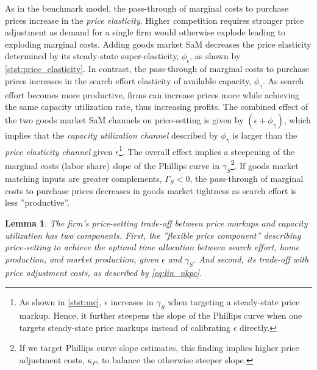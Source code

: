 \documentclass[12pt,3p,authoryear,review]{elsarticle}
\newtheorem{lemma}{Lemma}
\begin{document}
As in the benchmark model, the pass-through of marginal costs to purchase prices increase in the \emph{price elasticity}. Higher competition requires stronger price adjustment as demand for a single firm would otherwise explode leading to exploding marginal costs. Adding goods market SaM decreases the price elasticity determined by its steady-state super-elasticity, $\phi_\epsilon$, as shown by \eqref{stst:price_elasticity}. In contrast, the pass-through of marginal costs to purchase prices increases in the search effort elasticity of available capacity, $\phi_\gamma$. As search effort becomes more productive, firms can increase prices more while achieving the same capacity utilization rate, thus increasing profits. The combined effect of the two goods market SaM channels on price-setting is given by $(\epsilon+\phi_\gamma)$, which implies that the \emph{capacity utilization channel} described by $\phi_\gamma$ is larger than the \emph{price elasticity channel} given $\epsilon$\footnote{As shown in \eqref{stst:mc}, $\epsilon$ increases in $\gamma_S$ when targeting a steady-state price markup. Hence, it further steepens the slope of the Phillips curve when one targets steady-state price markups instead of calibrating $\epsilon$ directly.}. The overall effect implies a steepening of the marginal costs (labor share) slope of the Phillips curve in $\gamma_S$\footnote{If we target Phillips curve slope estimates, this finding implies higher price adjustment costs, $\kappa_P$, to balance the otherwise steeper slope.}. If goods market matching inputs are greater complements, $\Gamma_S < 0$, the pass-through of marginal costs to purchase prices decreases in goods market tightness as search effort is less ''productive''.%
\begin{lemma}\label{lem:nkpc}%
	The firm's price-setting trade-off between price markups and capacity utilization has two components. First, the ''flexible price component'' describing price-setting to achieve the optimal time allocation between search effort, home production, and market production, given $\epsilon$ and $\gamma_S$. And second, its trade-off with price adjustment costs, as described by \eqref{eq:lin_nkpc}.%
\end{lemma}%
\end{document}
